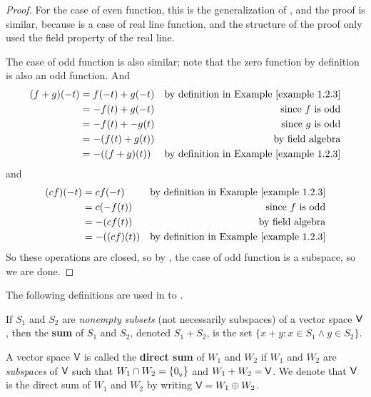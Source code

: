 \begin{proof}
For the case of even function, this is the generalization of , and the proof is similar,
because  is a case of real line function, and the structure of the proof only used the field property of the real line.

The case of odd function is also similar;
note that the zero function by definition is also an odd function.
And
\begin{align*}
    (f + g)(-t) & = f(-t) + g(-t) & \text{by definition in \EXAMPLE{1.2.3}} \\
                & = -f(t) + g(-t) & \text{since \(f\) is odd} \\
                & = -f(t) + -g(t) & \text{since \(g\) is odd} \\
                & = -(f(t) + g(t)) & \text{by field algebra} \\
                & = -((f + g)(t)) & \text{by definition in \EXAMPLE{1.2.3}}
\end{align*}
and
\begin{align*}
    (cf)(-t) & = cf(-t) & \text{by definition in \EXAMPLE{1.2.3}} \\
                & = c(-f(t)) & \text{since \(f\) is odd} \\
                & = -(cf(t)) & \text{by field algebra} \\
                & = -((cf)(t)) & \text{by definition in \EXAMPLE{1.2.3}}
\end{align*}
So these operations are closed, so by , the case of odd function is a subspace, so we are done.
\end{proof}

The following definitions are used in  to .

\begin{additional definition} \label{adef 1.8}
If \(S_1\) and \(S_2\) are \emph{nonempty} \emph{subsets} (not necessarily subspaces) of a vector space \(\textsf{V}\), then the \textbf{sum} of \(S_1\) and \(S_2\), denoted \(S_1 + S_2\), is the set \( \{ x + y : x \in S_1 \land y \in S_2 \} \).
\end{additional definition}

\begin{additional definition} \label{adef 1.9}
A vector space \(\textsf{V}\) is called the \textbf{direct sum} of \(W_1\) and \(W_2\) if \(W_1\) and \(W_2\) are \emph{subspaces} of \(\textsf{V}\) such that \(W_1 \cap W_2 = \{0_{_{\textsf{V}}}\}\) and \(W_1 + W_2 = \textsf{V}\).
We denote that \(\textsf{V}\) is the direct sum of \(W_1\) and \(W_2\) by writing \(\textsf{V} = W_1 \oplus W_2\).
\end{additional definition}

